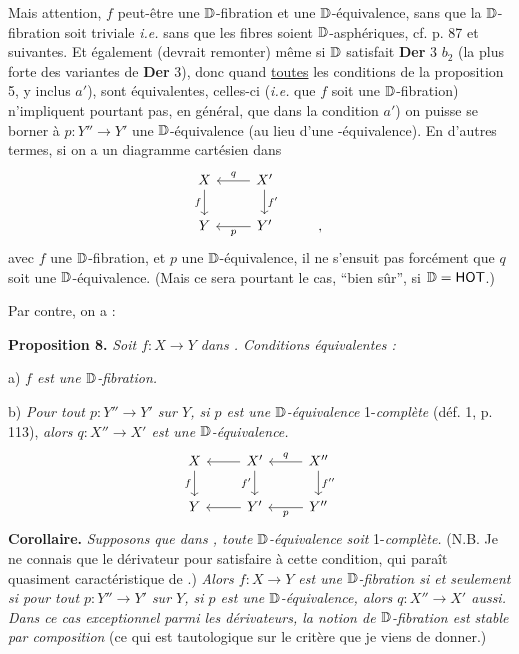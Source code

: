 Mais attention, $f$ peut-être une $\mathbb{D}$-fibration et une $\mathbb{D}$-équivalence, sans que la $\mathbb{D}$-fibration soit triviale \textit{i.e.} sans que les fibres soient $\mathbb{D}$-asphériques, cf. p. 87 et suivantes. %
Et également (devrait remonter) même si $\mathbb{D}$ satisfait \textbf{Der} 3 $b_2$ (la plus forte des variantes de \textbf{Der} 3), donc quand \underline{toutes} les conditions de la proposition 5, y inclus $a'$), sont équivalentes, celles-ci (\textit{i.e.} que $f$ soit une $\mathbb{D}$-fibration) n'impliquent pourtant pas, en général, que dans la condition $a'$) on puisse se borner à $p : Y'' \to Y'$ une $\mathbb{D}$-équivalence (au lieu d'une \Hot-équivalence). En d'autres termes, si on a un diagramme cartésien dans \Dia
\[
\begin{tikzcd}
X \arrow[d, "f"'] & X' \arrow[l, "q"'] \arrow[d, "f'"] \\
Y & Y' \arrow[l, "p"] & ,
\end{tikzcd}
\]
avec $f$ une $\mathbb{D}$-fibration, et $p$ une $\mathbb{D}$-équivalence, il ne s'ensuit pas forcément que $q$ soit une $\mathbb{D}$-équivalence. (Mais ce sera pourtant le cas, “bien sûr”, si $\mathbb{D} = \mathsf{HOT}$.)

Par contre, on a :

\textbf{Proposition 8.} \textit{Soit $f : X \to Y$ dans \Dia. Conditions équivalentes :}

a) \textit{$f$ est une $\mathbb{D}$-fibration.}

b) \textit{Pour tout $p : Y'' \to Y'$ sur $Y$, si $p$ est une $\mathbb{D}$-équivalence} 1-\textit{complète} (déf. 1, p. 113), \textit{alors $q : X'' \to X'$ est une $\mathbb{D}$-équivalence.}
\[
\begin{tikzcd}
X \arrow[d, "f"'] & X' \arrow[l] \arrow[d, "f'"'] & X'' \arrow[l, "q"'] \arrow[d, "f''"] \\
Y & Y' \arrow[l] & Y'' \arrow[l, "p"]
\end{tikzcd}
\]
\textbf{Corollaire.} \textit{Supposons que dans \Dia, toute $\mathbb{D}$-équivalence soit} 1-\textit{complète.} (N.B. Je ne connais que le dérivateur \HOT{} pour satisfaire à cette condition, qui paraît quasiment caractéristique de \HOT.) \textit{Alors $f : X \to Y$ est une $\mathbb{D}$-fibration si et seulement si pour tout $p : Y'' \to Y'$ sur $Y$, si $p$ est une $\mathbb{D}$-équivalence, alors $q : X'' \to X'$ aussi. Dans ce cas exceptionnel parmi les dérivateurs, la notion de $\mathbb{D}$-fibration est stable par composition} (ce qui est tautologique sur le critère que je viens de donner.)

